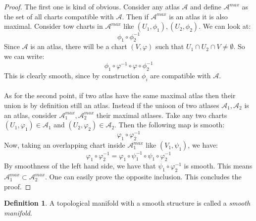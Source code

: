 \documentclass[12pt,a4paper]{report}
\theoremstyle{definition}
\newtheorem{Def}{Definition}[chapter]
\theoremstyle{Theorem}
\theoremstyle{break}
\theoremstyle{definition}
\begin{document}
		\begin{proof}
			The first one is kind of obvious. Consider any atlas $\mathcal{A}$ and define $\mathcal{A}^{max}$ as the set of all charts compatible with $\mathcal{A}$. Then if $\mathcal{A}^{max}$ is an atlas it is also maximal. Consider tow charts in $\mathcal{A}^{max}$ like $(U_1,\phi_1),(U_2,\phi_2)$. We can look at:
			$$\phi_1\circ \phi_2^{-1}$$
			Since $\mathcal{A}$ is an atlas, there will be a chart $(V,\varphi)$ such that $U_1\cap U_2\cap V\neq \emptyset$. So we can write:
			$$\phi_1\circ \varphi^{-1}\circ \varphi\circ \phi_2^{-1}$$
			This is clearly smooth, since by construction $\phi_i$ are compatible with $\mathcal{A}$.\\
			\\
			As for the second point, if two atlas have the same maximal atlas then their union is by definition still an atlas. Instead if the unioon of two atlases $\mathcal{A}_1,\mathcal{A}_2$ is an atlas, consider $\mathcal{A}^{max}_1,\mathcal{A}^{max}_2$ their maximal atlases. Take any two charts $(U_1,\varphi_1)\in\mathcal{A}_1$ and $(U_2,\varphi_2)\in\mathcal{A}_2$. Then the following map is smooth:
			$$\varphi_1\circ \varphi_2^{-1}$$
			Now, taking an overlapping chart inside $\mathcal{A}_1^{max}$ like $(V_1,\psi_1)$, we have:
			$$\varphi_1\circ \varphi_2^{-1}=\varphi_1\circ \psi_1^{-1}\circ \psi_1\circ \varphi_2^{-1}$$
			By smoothness of the left hand side, we have that $\psi_1\circ \varphi_2^{-1}$ is smooth. This means $\mathcal{A}_1^{max}\subset \mathcal{A}_2^{max}$. One can easily prove the opposite inclusion. This concludes the proof.
		\end{proof}
		\begin{Def}
			A topological manifold with a smooth structure is called a \textit{smooth manifold}.
		\end{Def}
\end{document}
